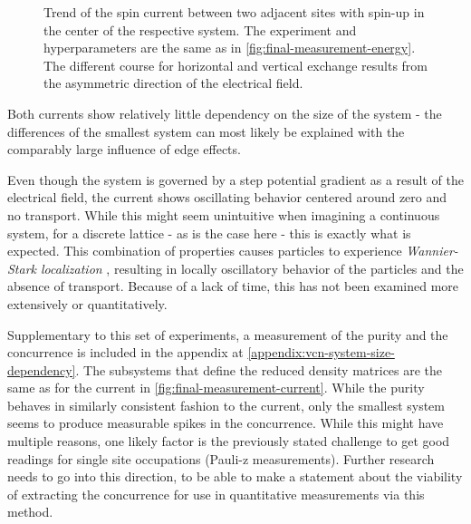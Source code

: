 \begin{figure}[htbp]
    \centering
    \vspace{-0.3cm}
    \caption{
            Trend of the spin current between two adjacent sites with spin-up in the center of the respective system.
            The experiment and hyperparameters are the same as in \autoref{fig:final-measurement-energy}.
            The different course for horizontal and vertical exchange results from the asymmetric direction of the electrical field.
        }
    \label{fig:final-measurement-current}
\end{figure}

Both currents show relatively little dependency on the size of the system - the differences of the smallest system can most likely be explained with the comparably large influence of edge effects.

Even though the system is governed by a step potential gradient as a result of the electrical field, the current shows oscillating behavior centered around zero and no transport.
While this might seem unintuitive when imagining a continuous system, for a discrete lattice - as is the case here - this is exactly what is expected.
This combination of properties causes particles to experience \emph{Wannier-Stark localization} \cite{starkManyBodyLocalization}, %
resulting in locally oscillatory behavior of the particles and the absence of transport.
Because of a lack of time, this has not been examined more extensively or quantitatively.

Supplementary to this set of experiments, a measurement of the purity and the concurrence is included in the appendix at \ref{appendix:vcn-system-size-dependency}.
The subsystems that define the reduced density matrices are the same as for the current in \autoref{fig:final-measurement-current}.
While the purity behaves in similarly consistent fashion to the current, only the smallest system seems to produce measurable spikes in the concurrence.
While this might have multiple reasons, one likely factor is the previously stated challenge to get good readings for single site occupations (Pauli-z measurements).
Further research needs to go into this direction, to be able to make a statement about the viability of extracting the concurrence for use in quantitative measurements via this method.